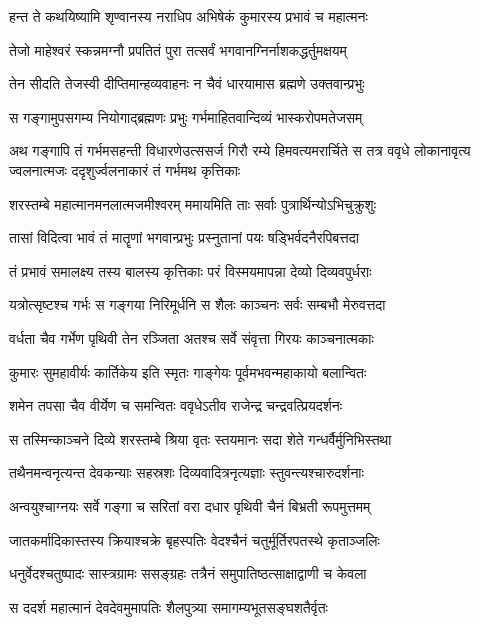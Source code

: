 \twolineshloka
{हन्त ते कथयिष्यामि शृण्वानस्य नराधिप}
{अभिषेकं कुमारस्य प्रभावं च महात्मनः}


\twolineshloka
{तेजो माहेश्वरं स्कन्नमग्नौ प्रपतितं पुरा}
{तत्सर्वं भगवानग्निर्नाशकद्धर्तुमक्षयम्}


\twolineshloka
{तेन सीदति तेजस्वी दीप्तिमान्हव्यवाहनः}
{न चैवं धारयामास ब्रह्मणे उक्तवान्प्रभुः}


\twolineshloka
{स गङ्गामुपसगम्य नियोगाद्ब्रह्मणः प्रभुः}
{गर्भमाहितवान्दिव्यं भास्करोपमतेजसम्}


अथ गङ्गापि तं गर्भमसहन्ती विधारणेउत्ससर्ज गिरौ रम्ये हिमवत्यमरार्चिते
\twolineshloka
{स तत्र ववृधे लोकानावृत्य ज्वलनात्मजः}
{ददृशुर्ज्वलनाकारं तं गर्भमथ कृत्तिकाः}


\twolineshloka
{शरस्तम्बे महात्मानमनलात्मजमीश्वरम्}
{ममायमिति ताः सर्वाः पुत्रार्थिन्योऽभिचुक्रुशुः}


\twolineshloka
{तासां विदित्वा भावं तं मातॄणां भगवान्प्रभुः}
{प्रस्नुतानां पयः षड्भिर्वदनैरपिबत्तदा}


\twolineshloka
{तं प्रभावं समालक्ष्य तस्य बालस्य कृत्तिकाः}
{परं विस्मयमापन्ना देव्यो दिव्यवपुर्धराः}


\twolineshloka
{यत्रोत्सृष्टश्च गर्भः स गङ्गया निरिमूर्धनि}
{स शैलः काञ्चनः सर्वः सम्बभौ मेरुवत्तदा}


\twolineshloka
{वर्धता चैव गर्भेण पृथिवी तेन रञ्जिता}
{अतश्च सर्वे संवृत्ता गिरयः काञ्चनात्मकाः}


\twolineshloka
{कुमारः सुमहावीर्यः कार्तिकेय इति स्मृतः}
{गाङ्गेयः पूर्वमभवन्महाकायो बलान्वितः}


\threelineshloka
{शमेन तपसा चैव वीर्येण च समन्वितः}
{ववृधेऽतीव राजेन्द्र चन्द्रवत्प्रियदर्शनः}
{}


\twolineshloka
{स तस्मिन्काञ्चने दिव्ये शरस्तम्बे श्रिया वृतः}
{स्तयमानः सदा शेते गन्धर्वैर्मुनिभिस्तथा}


\twolineshloka
{तथैनमन्वनृत्यन्त देवकन्याः सहस्रशः}
{दिव्यवादित्रनृत्यज्ञाः स्तुवन्त्यश्चारुदर्शनाः}


\threelineshloka
{अन्वयुश्चाग्नयः सर्वे गङ्गा च सरितां वरा}
{दधार पृथिवी चैनं बिभ्रती रूपमुत्तमम्}
{}


\twolineshloka
{जातकर्मादिकास्तस्य क्रियाश्चक्रे बृहस्पतिः}
{वेदश्चैनं चतुर्मूर्तिरपतस्थे कृताञ्जलिः}


\twolineshloka
{धनुर्वेदश्चतुष्पादः सास्त्रग्रामः ससङ्ग्रहः}
{तत्रैनं समुपातिष्ठत्साक्षाद्वाणी च केवला}


\twolineshloka
{स ददर्श महात्मानं देवदेवमुमापतिः}
{शैलपुत्र्या समागम्यभूतसङ्घशतैर्वृतः}



